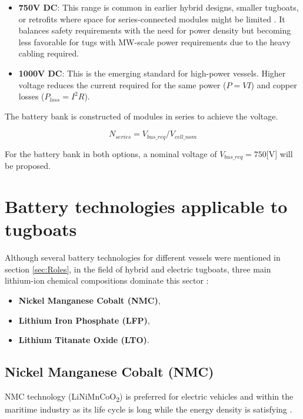 \begin{itemize}
	\item \textbf{750V DC}: This range is common in earlier hybrid designs, smaller tugboats, or retrofits where space for series-connected modules might be limited \cite{Valence}. It balances safety requirements with the need for power density but becoming less favorable for tugs with MW-scale power requirements due to the heavy cabling required.
	\item \textbf{1000V DC}: This is the emerging standard for high-power vessels. Higher voltage reduces the current required for the same power ($P=VI$) and copper losses ($P_{loss} = I^2R$).
\end{itemize}

The battery bank is constructed of modules in series to achieve the voltage.

\begin{equation}
	N_{series} = V_{bus\_req} / V_{cell\_nom}
\end{equation}

For the battery bank in both options, a nominal voltage of $V_{bus\_req}=750$[V] will be proposed.



\section{Battery technologies applicable to tugboats}

Although several battery technologies for different vessels were mentioned in section \ref{sec:Roles}, in the field of hybrid and electric tugboats, three main lithium-ion chemical compositions dominate this sector \cite{BattForum}:

\begin{itemize}

\item \textbf{Nickel Manganese Cobalt (NMC)},
\item \textbf{Lithium Iron Phosphate (LFP)},
\item \textbf{Lithium Titanate Oxide (LTO)}.

\end{itemize}


\subsection{Nickel Manganese Cobalt (NMC)}

NMC technology (LiNiMnCoO\textsubscript{2}) is preferred for
electric vehicles and within the
maritime industry as its life cycle is
long while the energy density is
satisfying \cite{MAN}.

